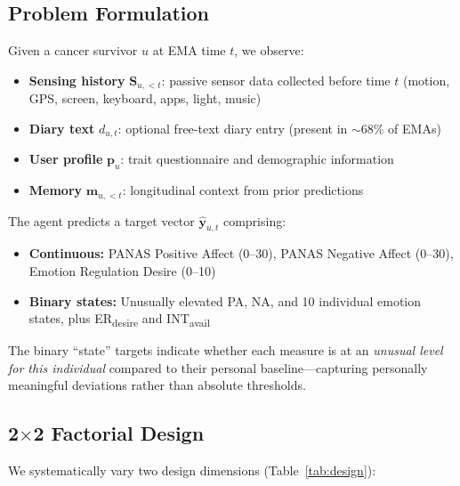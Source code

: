 \documentclass[screen,review,anonymous]{acmart}
\newcommand{\erdesire}{ER\textsubscript{desire}}
\newcommand{\intavail}{INT\textsubscript{avail}}
\begin{document}


\subsection{Problem Formulation}

Given a cancer survivor $u$ at EMA time $t$, we observe:
\begin{itemize}[nosep]
    \item \textbf{Sensing history} $\mathbf{S}_{u,<t}$: passive sensor data collected before time $t$ (motion, GPS, screen, keyboard, apps, light, music)
    \item \textbf{Diary text} $d_{u,t}$: optional free-text diary entry (present in $\sim$68\% of EMAs)
    \item \textbf{User profile} $\mathbf{p}_u$: trait questionnaire and demographic information
    \item \textbf{Memory} $\mathbf{m}_{u,<t}$: longitudinal context from prior predictions
\end{itemize}

\noindent The agent predicts a target vector $\hat{\mathbf{y}}_{u,t}$ comprising:
\begin{itemize}[nosep]
    \item \textbf{Continuous:} PANAS Positive Affect (0--30), PANAS Negative Affect (0--30), Emotion Regulation Desire (0--10)
    \item \textbf{Binary states:} Unusually elevated PA, NA, and 10 individual emotion states, plus \erdesire{} and \intavail{}
\end{itemize}

\noindent The binary ``state'' targets indicate whether each measure is at an \emph{unusual level for this individual} compared to their personal baseline---capturing personally meaningful deviations rather than absolute thresholds.

\subsection{2$\times$2 Factorial Design}

We systematically vary two design dimensions (Table~\ref{tab:design}):
\end{document}
